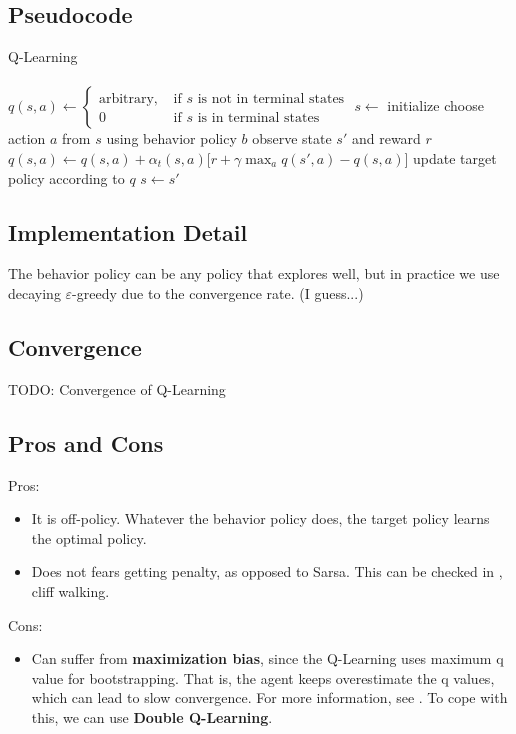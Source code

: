     \subsection{Pseudocode}
        {Q-Learning}
        {
            \inputitem{$\alpha_t(s,a) \in (0,1]$}{step size parameter satisfying RM condition} \\
             \\
        }
        {
        }
        {
            {$q(s,a) \leftarrow
            \begin{cases}
                \text{arbitrary,} &\text{ if $s$ is not in terminal states} \\
                0 &\text{ if $s$ is in terminal states}
            \end{cases}$\;}
            $s \leftarrow$ initialize\;
             {
                 {
                    choose action $a$ from $s$ using behavior policy $b$\;
                    observe state $s'$ and reward $r$\;
                    $q(s,a) \leftarrow q(s,a) + \alpha_t(s,a)\Big[ r + \gamma \max_a{q(s',a)} - q(s,a) \Big]$
                    update target policy according to $q$\;
                    $s \leftarrow s'$\;
                }
            }
        }
    \subsection{Implementation Detail}
        The behavior policy can be any policy that explores well, but in practice we use decaying $\varepsilon$-greedy due to the convergence rate. (I guess...)
    \subsection{Convergence}
        TODO: Convergence of Q-Learning
    \subsection{Pros and Cons}
        Pros:
        \begin{itemize}
            \item It is off-policy. Whatever the behavior policy does, the target policy learns the optimal policy.
            \item Does not fears getting penalty, as opposed to Sarsa. This can be checked in \cite{Sutton2020}, cliff walking.
        \end{itemize}
        Cons:
        \begin{itemize}
            \item Can suffer from \textbf{maximization bias}, since the Q-Learning uses maximum q value for bootstrapping. That is, the agent keeps
                overestimate the q values, which can lead to slow convergence. For more information, see \cite{Sutton2020}. To cope with this, we can use \textbf{Double Q-Learning}.
        \end{itemize}